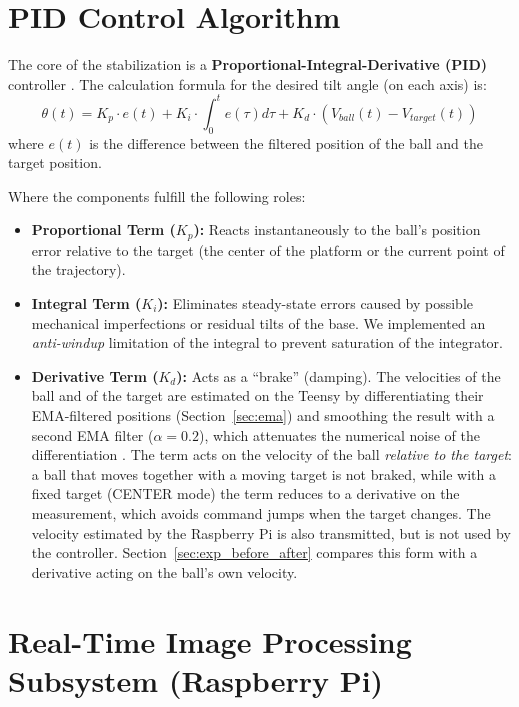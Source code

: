 \documentclass[12pt,a4paper]{report}
\begin{document}
\section{PID Control Algorithm}
The core of the stabilization is a \textbf{Proportional-Integral-Derivative (PID)} controller \cite{pid_control}. The calculation formula for the desired tilt angle (on each axis) is:
\begin{equation}
    \theta(t) = K_p \cdot e(t) + K_i \cdot \int_{0}^{t} e(\tau) d\tau + K_d \cdot \left(V_{ball}(t) - V_{target}(t)\right)
\end{equation}
where $e(t)$ is the difference between the filtered position of the ball and the target position.

Where the components fulfill the following roles:
\begin{itemize}
    \item \textbf{Proportional Term ($K_p$):} Reacts instantaneously to the ball's position error relative to the target (the center of the platform or the current point of the trajectory).
    \item \textbf{Integral Term ($K_i$):} Eliminates steady-state errors caused by possible mechanical imperfections or residual tilts of the base. We implemented an \textit{anti-windup} limitation of the integral to prevent saturation of the integrator.
    \item \textbf{Derivative Term ($K_d$):} Acts as a ``brake'' (damping). The velocities of the ball and of the target are estimated on the Teensy by differentiating their EMA-filtered positions (Section~\ref{sec:ema}) and smoothing the result with a second EMA filter ($\alpha = 0.2$), which attenuates the numerical noise of the differentiation \cite{derivative_filter}. The term acts on the velocity of the ball \textit{relative to the target}: a ball that moves together with a moving target is not braked, while with a fixed target (CENTER mode) the term reduces to a derivative on the measurement, which avoids command jumps when the target changes. The velocity estimated by the Raspberry Pi is also transmitted, but is not used by the controller. Section~\ref{sec:exp_before_after} compares this form with a derivative acting on the ball's own velocity.
\end{itemize}

\section{Real-Time Image Processing Subsystem (Raspberry Pi)}
\label{sec:vision}
\end{document}
